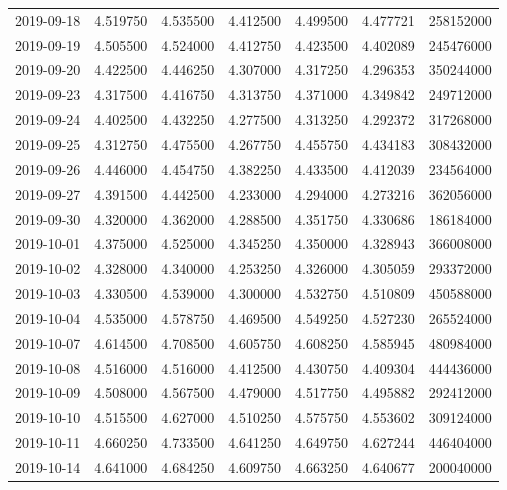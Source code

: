 \begin{tabular}{lrrrrrr}
2019-09-18 &    4.519750 &    4.535500 &    4.412500 &    4.499500 &    4.477721 &   258152000 \\
2019-09-19 &    4.505500 &    4.524000 &    4.412750 &    4.423500 &    4.402089 &   245476000 \\
2019-09-20 &    4.422500 &    4.446250 &    4.307000 &    4.317250 &    4.296353 &   350244000 \\
2019-09-23 &    4.317500 &    4.416750 &    4.313750 &    4.371000 &    4.349842 &   249712000 \\
2019-09-24 &    4.402500 &    4.432250 &    4.277500 &    4.313250 &    4.292372 &   317268000 \\
2019-09-25 &    4.312750 &    4.475500 &    4.267750 &    4.455750 &    4.434183 &   308432000 \\
2019-09-26 &    4.446000 &    4.454750 &    4.382250 &    4.433500 &    4.412039 &   234564000 \\
2019-09-27 &    4.391500 &    4.442500 &    4.233000 &    4.294000 &    4.273216 &   362056000 \\
2019-09-30 &    4.320000 &    4.362000 &    4.288500 &    4.351750 &    4.330686 &   186184000 \\
2019-10-01 &    4.375000 &    4.525000 &    4.345250 &    4.350000 &    4.328943 &   366008000 \\
2019-10-02 &    4.328000 &    4.340000 &    4.253250 &    4.326000 &    4.305059 &   293372000 \\
2019-10-03 &    4.330500 &    4.539000 &    4.300000 &    4.532750 &    4.510809 &   450588000 \\
2019-10-04 &    4.535000 &    4.578750 &    4.469500 &    4.549250 &    4.527230 &   265524000 \\
2019-10-07 &    4.614500 &    4.708500 &    4.605750 &    4.608250 &    4.585945 &   480984000 \\
2019-10-08 &    4.516000 &    4.516000 &    4.412500 &    4.430750 &    4.409304 &   444436000 \\
2019-10-09 &    4.508000 &    4.567500 &    4.479000 &    4.517750 &    4.495882 &   292412000 \\
2019-10-10 &    4.515500 &    4.627000 &    4.510250 &    4.575750 &    4.553602 &   309124000 \\
2019-10-11 &    4.660250 &    4.733500 &    4.641250 &    4.649750 &    4.627244 &   446404000 \\
2019-10-14 &    4.641000 &    4.684250 &    4.609750 &    4.663250 &    4.640677 &   200040000 \\

\end{tabular}

